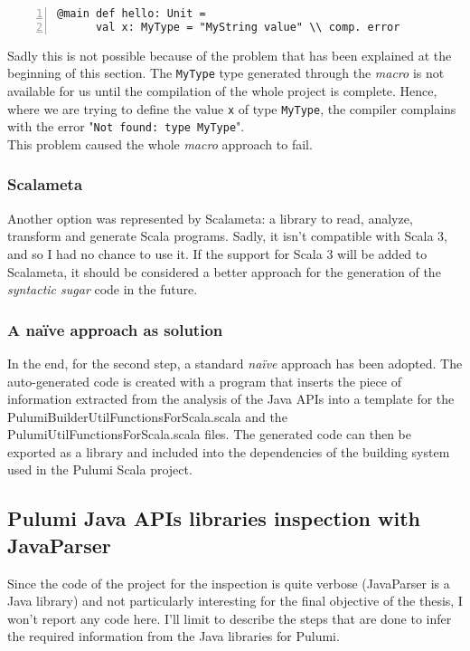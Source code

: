 \begin{minipage}{\linewidth}
  \begin{lstlisting}[numbers=left, numberstyle=\tiny, numbersep=-5pt, stepnumber=1]
    @main def hello: Unit = 
      val x: MyType = "MyString value" \\ comp. error
  \end{lstlisting}
\end{minipage}
Sadly this is not possible because of the problem that has been explained at the beginning of this section.
The \texttt{MyType} type generated through the \textit{macro} is not available for us until the compilation of the whole project is complete.
Hence, where we are trying to define the value \texttt{x} of type \texttt{MyType}, the compiler complains with the error "\texttt{Not found: type MyType}".\\
This problem caused the whole \textit{macro} approach to fail.


\subsubsection{Scalameta}
Another option was represented by Scalameta: a library to read, analyze, transform and generate Scala programs.
Sadly, it isn't compatible with Scala 3, and so I had no chance to use it.
If the support for Scala 3 will be added to Scalameta, it should be considered a better approach for the generation of the \textit{syntactic sugar} code in the future.

\subsubsection{A naïve approach as solution}
In the end, for the second step, a standard \textit{naïve} approach has been adopted.
The auto-generated code is created with a program that inserts the piece of information extracted from the analysis of the Java APIs into a template for the PulumiBuilderUtilFunctionsForScala.scala and the PulumiUtilFunctionsForScala.scala files.
The generated code can then be exported as a library and included into the dependencies of the building system used in the Pulumi Scala project.

\subsection{Pulumi Java APIs libraries inspection with JavaParser}
Since the code of the project for the inspection is quite verbose (JavaParser is a Java library) and not particularly interesting for the final objective of the thesis, I won't report any code here.
I'll limit to describe the steps that are done to infer the required information from the Java libraries for Pulumi.

